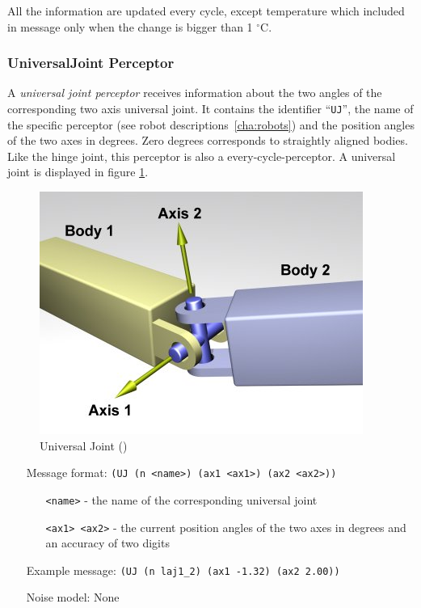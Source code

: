 All the information are updated every cycle, except temperature which
included in message only when the change is bigger than 1 $^\circ$C.

\subsubsection{UniversalJoint Perceptor}
\label{sec:UJP}
A \emph{universal joint perceptor} receives information about the two angles of
the corresponding two axis universal joint. It contains the identifier
``\texttt{UJ}'', the name of the specific perceptor (see robot
descriptions~\ref{cha:robots}) and the position angles of the two axes in
degrees. Zero degrees corresponds to straightly aligned bodies. Like the hinge
joint, this perceptor is also a every-cycle-perceptor. A universal joint is
displayed in figure \ref{ode:universaljoint}.

\begin{figure}[htbp]
  \begin{center}
	\includegraphics[scale=0.6]{fig/UniversalJoint.png}
    \caption{Universal Joint (\cite{ODEManual})}
    \label{ode:universaljoint}
  \end{center}
\end{figure}
 
\begin{itemize}
	\item[Message format:] \texttt{(UJ (n <name>) (ax1 <ax1>) (ax2 <ax2>))}
		\begin{itemize}
		  \item[\texttt{<name>} -] the name of the corresponding universal joint
		  \item[\texttt{<ax1> <ax2>} -] the current position angles of the two axes in
		  degrees and an accuracy of two digits
		\end{itemize}
	\item[Example message:] \texttt{(UJ (n laj1\_2) (ax1 -1.32) (ax2 2.00))}
	\item[Noise model:] None
\end{itemize}



